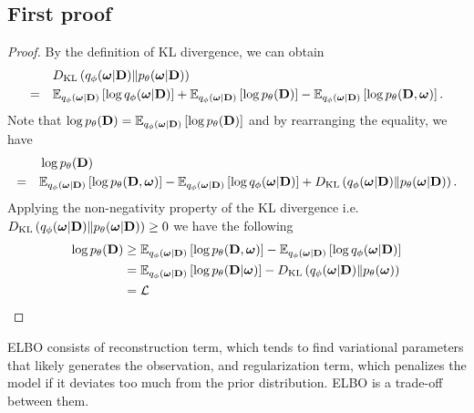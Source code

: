 \documentclass{article}
\begin{document}
\subsection*{First proof}
\begin{proof}
	By the definition of KL divergence, we can obtain
    \begin{align*}
    	&\KL{q_{\phi}(\bfomega|\bfD)}{p_{\theta}(\bfomega|\bfD)}\\
    	=\quad 
    	&\Exp{\log q_{\phi}(\bfomega|\bfD)}{q_{\phi}(\bfomega|\bfD)} + \Exp{\log p_{\theta}(\bfD)}{q_{\phi}(\bfomega|\bfD)} - \Exp{\log p_{\theta}(\bfD, \bfomega)}{q_{\phi}(\bfomega|\bfD)}.
    \end{align*}
    Note that $\log p_{\theta}(\bfD)=\Exp{\log p_{\theta}(\bfD)}{q_{\phi}(\bfomega|\bfD)}$
    and by rearranging the equality, we have
    \begin{align*}
    	&\log p_{\theta}(\bfD) \\
    	=\quad 
    	&\Exp{\log p_{\theta}(\bfD, \bfomega)}{q_{\phi}(\bfomega|\bfD)} - \Exp{\log q_{\phi}(\bfomega|\bfD)}{q_{\phi}(\bfomega|\bfD)} + \KL{q_{\phi}(\bfomega|\bfD)}{p_{\theta}(\bfomega|\bfD)}.
    \end{align*}
    Applying the non-negativity property of the KL divergence i.e. $\KL{q_{\phi}(\bfomega|\bfD)}{p_{\theta}(\bfomega|\bfD)} \ge 0$
    we have the following
    \begin{align*}
        \log p_{\theta}(\bfD) 
        &\ge \Exp{\log p_{\theta}(\bfD, \bfomega)}{q_{\phi}(\bfomega|\bfD)} - \Exp{\log q_{\phi}(\bfomega|\bfD)}{q_{\phi}(\bfomega|\bfD)} \\
        &= \Exp{\log p_{\theta}(\bfD|\bfomega)}{q_{\phi}(\bfomega|\bfD)} - \KL{q_{\phi}(\bfomega|\bfD)}{p_{\theta}(\bfomega)} \\
        &= \ccL
    \end{align*}
\end{proof}
ELBO consists of reconstruction term, which tends to find variational parameters that likely generates the observation, and regularization term, which penalizes the model if it deviates too much from the prior distribution. ELBO is a trade-off between them. 
\end{document}
